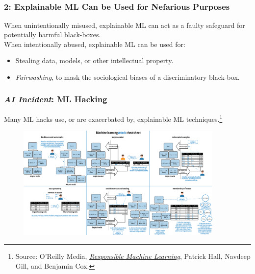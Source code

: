 \documentclass[11pt,aspectratio=169,hyperref={colorlinks}]{beamer}
\begin{document}
	\subsection*{} %

	\begin{frame}
	
		\frametitle{2: Explainable ML Can be Used for \textbf{Nefarious Purposes}}	
		\Large
		When unintentionally misused, explainable ML can act as a faulty safeguard for potentially harmful black-boxes.\\
		\vspace{10pt}
		When intentionally abused, explainable ML can be used for: 
		\begin{itemize}
			\item Stealing data, models, or other intellectual property.
			\item \textit{Fairwashing}, to mask the sociological biases of a discriminatory black-box.
		\end{itemize}
	
	\end{frame}

	\begin{frame}
	
		\frametitle{\textit{\textbf{AI Incident}}: ML Hacking}
		
				\footnotesize{Many ML hacks use, or are exacerbated by, explainable ML techniques.}\footnote{\tiny{Source: O'Reilly Media, \href{http://info.h2o.ai/rs/644-PKX-778/images/OReilly_Responsible_ML_eBook.pdf}{\textit{Responsible Machine Learning}}, Patrick Hall, Navdeep Gill, and Benjamin Cox.}
}				\begin{figure}
					\begin{center}
						\includegraphics[height=160pt]{../img/Attack_Cheat_Sheet.png}
					\end{center}
				\end{figure}	
				\normalsize
	
	\end{frame}
	
\end{document}
